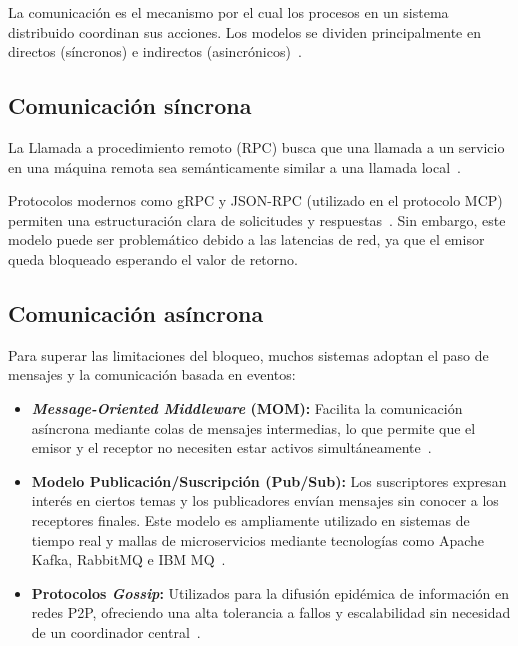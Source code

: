 \documentclass[12pt,a4paper]{article}
\begin{document}
La comunicación es el mecanismo por el cual los procesos en un sistema distribuido coordinan sus acciones. Los modelos se dividen principalmente en directos (síncronos) e indirectos (asincrónicos)~\cite{r08}.

\subsection{Comunicación síncrona}

La Llamada a procedimiento remoto (RPC) busca que una llamada a un servicio en una máquina remota sea semánticamente similar a una llamada local~\cite{r08}.

Protocolos modernos como gRPC y JSON-RPC (utilizado en el protocolo MCP) permiten una estructuración clara de solicitudes y respuestas~\cite{r09}. Sin embargo, este modelo puede ser problemático debido a las latencias de red, ya que el emisor queda bloqueado esperando el valor de retorno.

\subsection{Comunicación asíncrona}

Para superar las limitaciones del bloqueo, muchos sistemas adoptan el paso de mensajes y la comunicación basada en eventos:

\begin{itemize}
	\item \textbf{\textit{Message-Oriented Middleware} (MOM):} Facilita la comunicación asíncrona mediante colas de mensajes intermedias, lo que permite que el emisor y el receptor no necesiten estar activos simultáneamente~\cite{r10}.

	\item \textbf{Modelo Publicación/Suscripción (Pub/Sub):} Los suscriptores expresan interés en ciertos temas y los publicadores envían mensajes sin conocer a los receptores finales. Este modelo es ampliamente utilizado en sistemas de tiempo real y mallas de microservicios mediante tecnologías como Apache Kafka, RabbitMQ e IBM MQ~\cite{r11}.

	\item \textbf{Protocolos \textit{Gossip}:} Utilizados para la difusión epidémica de información en redes P2P, ofreciendo una alta tolerancia a fallos y escalabilidad sin necesidad de un coordinador central~\cite{r12}.
\end{itemize}

\end{document}
